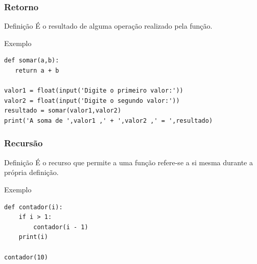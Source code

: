 \documentclass[aspectratio=169]{beamer} %
\begin{document}
\begin{frame}[fragile]
	\frametitle{Retorno}
	
	\begin{block}{Definição}
		É o resultado de alguma operação realizado pela função.
	\end{block}\vfill
	
	\begin{exampleblock}{Exemplo}
		\begin{lstlisting}
def somar(a,b):
   return a + b
			
valor1 = float(input('Digite o primeiro valor:'))
valor2 = float(input('Digite o segundo valor:'))
resultado = somar(valor1,valor2)
print('A soma de ',valor1 ,' + ',valor2 ,' = ',resultado)
		\end{lstlisting}
	\end{exampleblock}
\end{frame}

\begin{frame}[fragile]
\frametitle{Recursão}

\begin{block}{Definição}
É o recurso que permite a uma função refere-se a si mesma durante a própria definição.
\end{block} \vfill

\begin{exampleblock}{Exemplo}
\begin{lstlisting}
def contador(i):
    if i > 1:
        contador(i - 1)
    print(i)

contador(10)
\end{lstlisting}
\end{exampleblock}
\end{frame}
\end{document}
